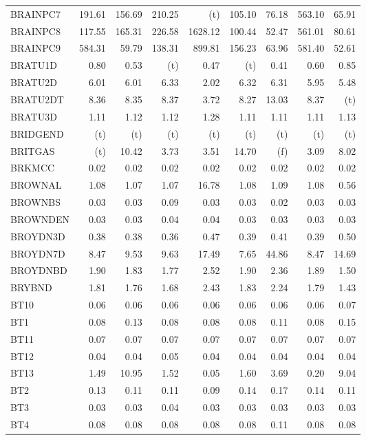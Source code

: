 \documentclass[11pt,twoside]{article}
\begin{document}
{\begin{longtable}[c]{|l|r|r|r|r|r|r|r|r|}
BRAINPC7 & 191.61 & 156.69 & 210.25 & (t) & 105.10 & 76.18 & 563.10 & 65.91 \\
BRAINPC8 & 117.55 & 165.31 & 226.58 & 1628.12 & 100.44 & 52.47 & 561.01 & 80.61 \\
BRAINPC9 & 584.31 & 59.79 & 138.31 & 899.81 & 156.23 & 63.96 & 581.40 & 52.61 \\
BRATU1D & 0.80 & 0.53 & (t) & 0.47 & (t) & 0.41 & 0.60 & 0.85 \\
BRATU2D & 6.01 & 6.01 & 6.33 & 2.02 & 6.32 & 6.31 & 5.95 & 5.48 \\
BRATU2DT & 8.36 & 8.35 & 8.37 & 3.72 & 8.27 & 13.03 & 8.37 & (t) \\
BRATU3D & 1.11 & 1.12 & 1.12 & 1.28 & 1.11 & 1.11 & 1.11 & 1.13 \\
BRIDGEND & (t) & (t) & (t) & (t) & (t) & (t) & (t) & (t) \\
BRITGAS & (t) & 10.42 & 3.73 & 3.51 & 14.70 & (f) & 3.09 & 8.02 \\
BRKMCC & 0.02 & 0.02 & 0.02 & 0.02 & 0.02 & 0.02 & 0.02 & 0.02 \\
BROWNAL & 1.08 & 1.07 & 1.07 & 16.78 & 1.08 & 1.09 & 1.08 & 0.56 \\
BROWNBS & 0.03 & 0.03 & 0.09 & 0.03 & 0.03 & 0.02 & 0.03 & 0.03 \\
BROWNDEN & 0.03 & 0.03 & 0.04 & 0.04 & 0.03 & 0.03 & 0.03 & 0.03 \\
BROYDN3D & 0.38 & 0.38 & 0.36 & 0.47 & 0.39 & 0.41 & 0.39 & 0.50 \\
BROYDN7D & 8.47 & 9.53 & 9.63 & 17.49 & 7.65 & 44.86 & 8.47 & 14.69 \\
BROYDNBD & 1.90 & 1.83 & 1.77 & 2.52 & 1.90 & 2.36 & 1.89 & 1.50 \\
BRYBND & 1.81 & 1.76 & 1.68 & 2.43 & 1.83 & 2.24 & 1.79 & 1.43 \\
BT10 & 0.06 & 0.06 & 0.06 & 0.06 & 0.06 & 0.06 & 0.06 & 0.07 \\
BT1 & 0.08 & 0.13 & 0.08 & 0.08 & 0.08 & 0.11 & 0.08 & 0.15 \\
BT11 & 0.07 & 0.07 & 0.07 & 0.07 & 0.07 & 0.07 & 0.07 & 0.07 \\
BT12 & 0.04 & 0.04 & 0.05 & 0.04 & 0.04 & 0.04 & 0.04 & 0.04 \\
BT13 & 1.49 & 10.95 & 1.52 & 0.05 & 1.60 & 3.69 & 0.20 & 9.04 \\
BT2 & 0.13 & 0.11 & 0.11 & 0.09 & 0.14 & 0.17 & 0.14 & 0.11 \\
BT3 & 0.03 & 0.03 & 0.04 & 0.03 & 0.03 & 0.03 & 0.03 & 0.03 \\
BT4 & 0.08 & 0.08 & 0.08 & 0.08 & 0.08 & 0.11 & 0.08 & 0.08 \\

\end{longtable}}
\end{document}
